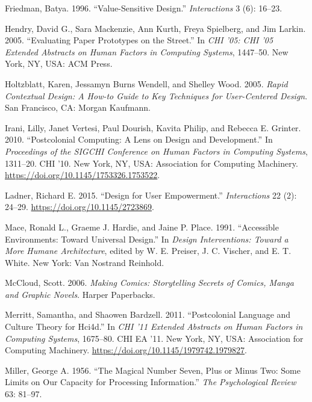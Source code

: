 \begin{CSLReferences}{1}{0}
\leavevmode{}%
Friedman, Batya. 1996. {``Value-Sensitive Design.''} \emph{Interactions}
3 (6): 16--23.

\leavevmode{}%
Hendry, David G., Sara Mackenzie, Ann Kurth, Freya Spielberg, and Jim
Larkin. 2005. {``Evaluating Paper Prototypes on the Street.''} In
\emph{{CHI} '05: {CHI} '05 Extended Abstracts on Human Factors in
Computing Systems}, 1447--50. New York, NY, USA: ACM Press.

\leavevmode{}%
Holtzblatt, Karen, Jessamyn Burns Wendell, and Shelley Wood. 2005.
\emph{Rapid Contextual Design: A How-to Guide to Key Techniques for
User-Centered Design}. San Francisco, CA: Morgan Kaufmann.

\leavevmode{}%
Irani, Lilly, Janet Vertesi, Paul Dourish, Kavita Philip, and Rebecca E.
Grinter. 2010. {``Postcolonial Computing: A Lens on Design and
Development.''} In \emph{Proceedings of the SIGCHI Conference on Human
Factors in Computing Systems}, 1311--20. CHI '10. New York, NY, USA:
Association for Computing Machinery.
\url{https://doi.org/10.1145/1753326.1753522}.

\leavevmode{}%
Ladner, Richard E. 2015. {``Design for User Empowerment.''}
\emph{Interactions} 22 (2): 24--29.
\url{https://doi.org/10.1145/2723869}.

\leavevmode{}%
Mace, Ronald L., Graeme J. Hardie, and Jaine P. Place. 1991.
{``Accessible Environments: Toward Universal Design.''} In \emph{Design
Interventions: Toward a More Humane Architecture}, edited by W. E.
Preiser, J. C. Vischer, and E. T. White. New York: Van Nostrand
Reinhold.

\leavevmode{}%
McCloud, Scott. 2006. \emph{Making Comics: Storytelling Secrets of
Comics, Manga and Graphic Novels}. Harper Paperbacks.

\leavevmode{}%
Merritt, Samantha, and Shaowen Bardzell. 2011. {``Postcolonial Language
and Culture Theory for Hci4d.''} In \emph{CHI '11 Extended Abstracts on
Human Factors in Computing Systems}, 1675--80. CHI EA '11. New York, NY,
USA: Association for Computing Machinery.
\url{https://doi.org/10.1145/1979742.1979827}.

\leavevmode{}%
Miller, George A. 1956. {``The Magical Number Seven, Plus or Minus Two:
Some Limits on Our Capacity for Processing Information.''} \emph{The
Psychological Review} 63: 81--97.


\end{CSLReferences}

